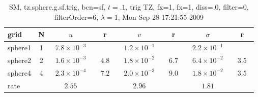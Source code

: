 \begin{table}[hbt]\tableFont %
\begin{center}
\begin{tabular}{|l|c|c|c|c|c|c|c|} \hline 
grid  & N &  $u$  & r &  $v$  & r &  $\sigma$   & r \\ \hline 
             sphere1 &     1 & ~$7.8\times10^{ -3}$~ &           & ~$1.2\times10^{ -1}$~ &           & ~$2.2\times10^{ -1}$~ &            \\ \hline
             sphere2 &     2 & ~$1.6\times10^{ -3}$~ & ~$  4.8$~ & ~$1.8\times10^{ -2}$~ & ~$  6.7$~ & ~$6.4\times10^{ -2}$~ & ~$  3.5$~  \\ \hline
             sphere4 &     4 & ~$2.3\times10^{ -4}$~ & ~$  7.2$~ & ~$2.0\times10^{ -3}$~ & ~$  9.0$~ & ~$1.8\times10^{ -2}$~ & ~$  3.5$~  \\ \hline
    rate             &       &       $2.55$         &       &       $2.96$         &       &       $1.81$         &        \\ \hline
\end{tabular}
\caption{SM, tz.sphere.g.sf.trig, bcn=sf, $t=.1$, trig TZ, fx=1, fx=1, diss=.0, filter=0, filterOrder=6, $\lambda=1$, Mon Sep 28 17:21:55 2009}\label{table:tz.sphere.g.sf.trig}
\end{center}
\end{table}
